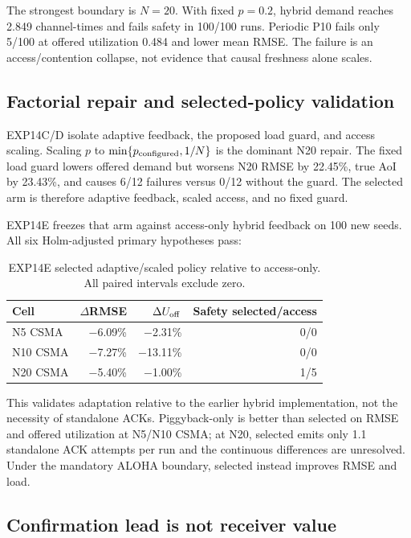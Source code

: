 The strongest boundary is $N=20$. With fixed $p=0.2$, hybrid demand reaches
2.849 channel-times and fails safety in 100/100 runs. Periodic P10 fails only
5/100 at offered utilization 0.484 and lower mean RMSE. The failure is an
access/contention collapse, not evidence that causal freshness alone scales.

\subsection{Factorial repair and selected-policy validation}

EXP14C/D isolate adaptive feedback, the proposed load guard, and access
scaling. Scaling $p$ to $\min\{p_{\rm configured},1/N\}$ is the dominant N20
repair. The fixed load guard lowers offered demand but worsens N20 RMSE by
22.45\%, true AoI by 23.43\%, and causes 6/12 failures versus 0/12 without the
guard. The selected arm is therefore adaptive feedback, scaled access, and no
fixed guard.

EXP14E freezes that arm against access-only hybrid feedback on 100 new seeds.
All six Holm-adjusted primary hypotheses pass:

\begin{table}[t]
\centering
\caption{EXP14E selected adaptive/scaled policy relative to access-only.
All paired intervals exclude zero.}
\label{tab:s2-exp14e}
\scriptsize
\begin{tabular}{lrrr}
\toprule
Cell & $\Delta$RMSE & $\Delta U_{\rm off}$ & Safety selected/access \\
\midrule
N5 CSMA & $-$6.09\% & $-$2.31\% & 0/0 \\
N10 CSMA & $-$7.27\% & $-$13.11\% & 0/0 \\
N20 CSMA & $-$5.40\% & $-$1.00\% & 1/5 \\
\bottomrule
\end{tabular}
\end{table}

This validates adaptation relative to the earlier hybrid implementation, not
the necessity of standalone ACKs. Piggyback-only is better than selected on
RMSE and offered utilization at N5/N10 CSMA; at N20, selected emits only 1.1
standalone ACK attempts per run and the continuous differences are unresolved.
Under the mandatory ALOHA boundary, selected instead improves RMSE and load.

\subsection{Confirmation lead is not receiver value}

